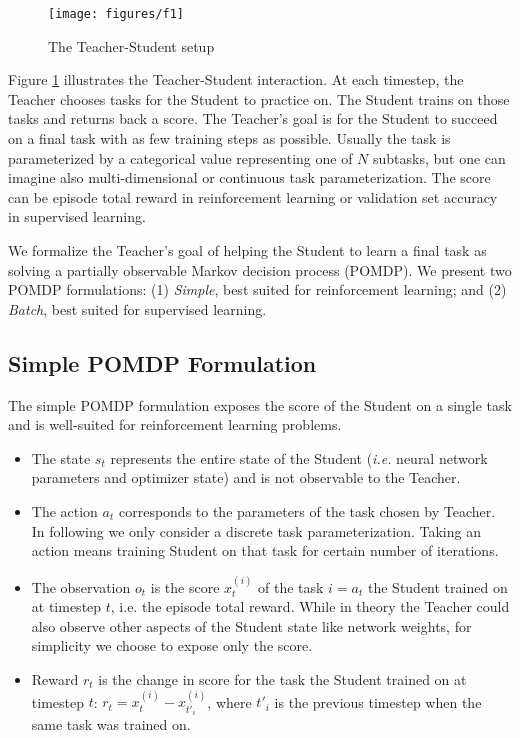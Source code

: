 \documentclass{article}
\begin{document}
\begin{figure}[h!]
  \texttt{[image: figures/f1]}
\caption{The Teacher-Student setup}
\label{f1} 
\end{figure}

Figure \ref{f1} illustrates the Teacher-Student interaction.  At each timestep, the Teacher chooses tasks for the Student to practice on. The Student trains on those tasks and returns back a score. The Teacher's goal is for the Student to succeed on a final task with as few training steps as possible. Usually the task is parameterized by a categorical value representing one of $N$ subtasks, but one can imagine also multi-dimensional or continuous task parameterization. The score can be episode total reward in reinforcement learning or validation set accuracy in supervised learning.

We formalize the Teacher's goal of helping the Student to learn a final task as solving a partially observable Markov decision process (POMDP). We present two POMDP formulations: (1) \textit{Simple}, best suited for reinforcement learning; and (2) \textit{Batch}, best suited for supervised learning.

\subsection{Simple POMDP Formulation}
\label{ssec21}

The simple POMDP formulation exposes the score of the Student on a single task and is well-suited for reinforcement learning problems.
\begin{itemize}
\item  The state $s_t$ represents the entire state of the Student (\textit{i.e.} neural network parameters and optimizer state) and is not observable to the Teacher.

\item  The action $a_t$ corresponds to the parameters of the task chosen by Teacher. In following we only consider a discrete task parameterization. Taking an action means training Student on that task for certain number of iterations.

\item  The observation $o_t$ is the score $x^{(i)}_t$ of the task $i=a_t$ the Student trained on at timestep $t$, i.e. the episode total reward.
While in theory the Teacher could also observe other aspects of the Student state like network weights, for simplicity we choose to expose only the score.

\item  Reward $r_t$ is the change in score for the task the Student trained on at timestep $t$: $r_t=x^{(i)}_t-x^{(i)}_{t'_i}$, 
where $t'_i$ is the previous timestep when the same task was trained on.
\end{itemize}
\end{document}

